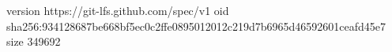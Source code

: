 version https://git-lfs.github.com/spec/v1
oid sha256:934128687be668bf5ec0c2ffe0895012012c219d7b6965d46592601ceafd45e7
size 349692
